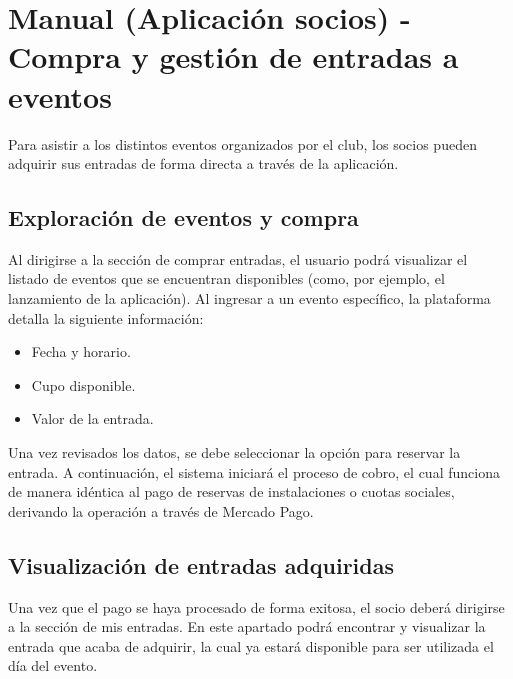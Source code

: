 \section{Manual (Aplicación socios) - Compra y gestión de entradas a eventos}

Para asistir a los distintos eventos organizados por el club, los socios pueden adquirir sus entradas de forma directa a través de la aplicación.

\subsection{Exploración de eventos y compra}
Al dirigirse a la sección de comprar entradas, el usuario podrá visualizar el listado de eventos que se encuentran disponibles (como, por ejemplo, el lanzamiento de la aplicación). Al ingresar a un evento específico, la plataforma detalla la siguiente información:
\begin{itemize}
    \item Fecha y horario.
    \item Cupo disponible.
    \item Valor de la entrada.
\end{itemize}

Una vez revisados los datos, se debe seleccionar la opción para reservar la entrada. A continuación, el sistema iniciará el proceso de cobro, el cual funciona de manera idéntica al pago de reservas de instalaciones o cuotas sociales, derivando la operación a través de Mercado Pago.

\subsection{Visualización de entradas adquiridas}
Una vez que el pago se haya procesado de forma exitosa, el socio deberá dirigirse a la sección de mis entradas. En este apartado podrá encontrar y visualizar la entrada que acaba de adquirir, la cual ya estará disponible para ser utilizada el día del evento.
